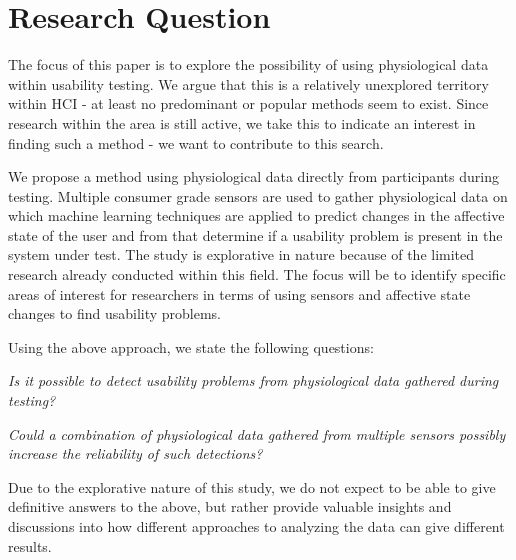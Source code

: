 \section{Research Question}
The focus of this paper is to explore the possibility of using physiological data within usability testing. We argue
that this is a relatively unexplored territory within HCI - at least no predominant or popular methods seem to
exist. Since research within the area is still active, we take this to indicate an interest in finding such a method -
we want to contribute to this search.

We propose a method using physiological data directly from participants during testing.  Multiple consumer grade
sensors are used to gather physiological data on which machine learning techniques are applied to predict changes in the
affective state of the user and from that determine if a usability problem is present in the system under test. The study is
explorative in nature because of the limited research already conducted within this field.  The focus will be to
identify specific areas of interest for researchers in terms of using sensors and affective state changes to find
usability problems.

Using the above approach, we state the following questions:

\textit{Is it possible to detect usability problems from physiological data gathered during testing?}

\textit{Could a combination of physiological data gathered from multiple sensors possibly increase the reliability of such detections?}

Due to the explorative nature of this study, we do not expect to be able to give definitive answers to the above, but
rather provide valuable insights and discussions into how different approaches to analyzing the data can give different results.